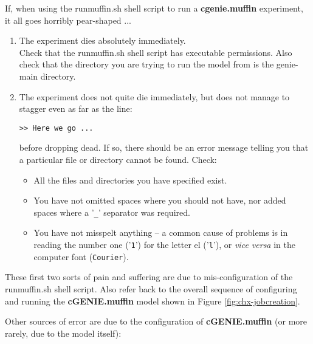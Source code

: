 \documentclass[11pt,fleqn]{book} %
\begin{document}
If, when using the \textsf{\footnotesize runmuffin.sh} shell script to run a \textbf{cgenie.muffin} experiment, it all goes horribly pear-shaped ...
\vspace{1mm}
\begin{enumerate}

\vspace{1mm}
\item The experiment dies absolutely immediately.
\\Check that the \textsf{\footnotesize runmuffin.sh} shell script has executable permissions. Also check that the directory you are trying to run the model from is the \textsf{\footnotesize genie-main} directory.

\item The experiment does not quite die immediately, but does not manage to stagger even as far as the line:
\vspace{-4pt}\begin{verbatim}
>> Here we go ...
\end{verbatim}\vspace{-4pt}
before dropping dead. If so, there should be an error message telling you that a particular file or directory cannot be found. Check:

\begin{itemize}
\item All the files and directories you have specified exist.
\item You have not omitted spaces where you should not have, nor added spaces where a '\texttt{\_}' separator was required.
\item You have not misspelt anything -- a common cause of problems is in reading the number one ('\texttt{1}') for the letter el ('\texttt{l}'), or \textit{vice versa} in the computer font (\texttt{Courier}).
\end{itemize}

\end{enumerate}
\vspace{2mm}

\noindent These first two sorts of pain and suffering are due to mis-configuration of the \textsf{\footnotesize runmuffin.sh} shell script. Also refer back to the overall sequence of configuring and running the \textbf{cGENIE.muffin} model shown in Figure \ref{fig:chx-jobcreation}.

\noindent Other sources of error are due to the configuration of \textbf{cGENIE.muffin} (or more rarely, due to the model itself):
\end{document}
